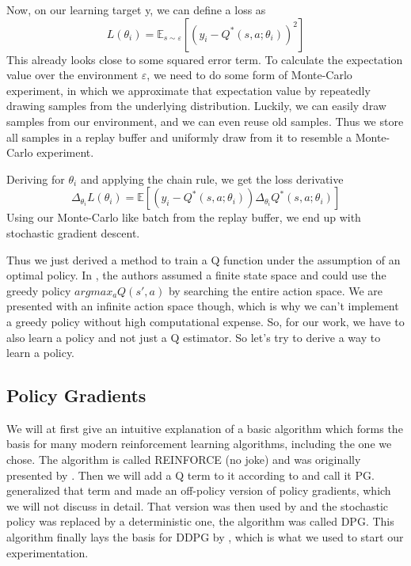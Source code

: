 \documentclass[hyperref,german,beleg]{cgvpub}
\begin{document}
Now, on our learning target y, we can define a loss as
\begin{equation}
L(\theta_i) = \mathbb{E}_{s \sim \varepsilon}[(y_i - Q^*(s, a;\theta_i))^2]
\end{equation}
This already looks close to some squared error term. To calculate the expectation value over the environment $\varepsilon$, we need to do some form of Monte-Carlo experiment, in which we approximate that expectation value by repeatedly drawing samples from the underlying distribution. Luckily, we can easily draw samples from our environment, and we can even reuse old samples. Thus we store all samples in a replay buffer and uniformly draw from it to resemble a Monte-Carlo experiment. 

Deriving for $\theta_i$ and applying the chain rule, we get the loss derivative
\begin{equation}
\Delta_{\theta_i} L(\theta_i) = \mathbb{E}[(y_i - Q^*(s, a;\theta_i))\Delta_{\theta_i}Q^*(s, a;\theta_i)]
\end{equation}
Using our Monte-Carlo like batch from the replay buffer, we end up with stochastic gradient descent.

Thus we just derived a method to train a Q function under the assumption of an optimal policy. In \cite{mnihPlayingAtariDeep2013}, the authors assumed a finite state space and could use the greedy policy $argmax_a Q(s', a)$ by searching the entire action space. We are presented with an infinite action space though, which is why we can't implement a greedy policy without high computational expense. So, for our work, we have to also learn a policy and not just a Q estimator. So let's try to derive a way to learn a policy.


\subsection{Policy Gradients}

We will at first give an intuitive explanation of a basic algorithm which forms the basis for many modern reinforcement learning algorithms, including the one we chose. The algorithm is called \ac{REINFORCE} (no joke) and was originally presented by \cite{williamsSimpleStatisticalGradientfollowing}. Then we will add a Q term to it according to \cite{suttonPolicyGradientMethods} and call it \ac{PG}. \cite{degrisOffPolicyActorCritic2013} generalized that term and made an off-policy version of policy gradients, which we will not discuss in detail. That version was then used by \cite{silverDeterministicPolicyGradient2013} and the stochastic policy was replaced by a deterministic one, the algorithm was called \ac{DPG}. This algorithm finally lays the basis for \ac{DDPG} by \cite{lillicrapCONTINUOUSCONTROLDEEP2015}, which is what we used to start our experimentation.
\end{document}
